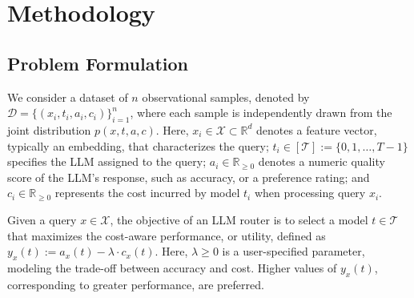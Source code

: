 \documentclass{article}
\theoremstyle{remark}
\begin{document}
\section{Methodology}

\subsection{Problem Formulation}

We consider a dataset of $n$ observational samples, denoted by $ \mathcal{D} = \{(x_i, t_i, a_i, c_i)\}_{i=1}^n $, where each sample is independently drawn from the joint distribution $ p(x, t, a, c) $. Here, $ x_i \in \mathcal{X} \subset \mathbb{R}^d $ denotes a feature vector, typically an embedding, that characterizes the query; 
$ t_i \in [\mathcal{T}] := \{0, 1, \dots, T-1\} $ specifies the LLM assigned to the query; %
$a_i \in \mathbb{R}_{\geq 0}$ denotes a numeric quality score of the LLM's response, such as accuracy, or a preference rating; and $ c_i \in \mathbb{R}_{\geq 0} $ represents the cost incurred by model $t_i $ when processing query $x_i$. 



Given a query $x \in \mathcal{X}$, the objective of an LLM router is to select a model $t \in \mathcal{T}$ that maximizes the cost-aware performance, or utility, defined as $y_x(t) := a_x(t) - \lambda \cdot c_x(t)$. Here, $\lambda \geq 0$ is a user-specified parameter, modeling the trade-off between accuracy and cost. Higher values of $y_x(t)$, corresponding to greater performance, are preferred.




\end{document}
